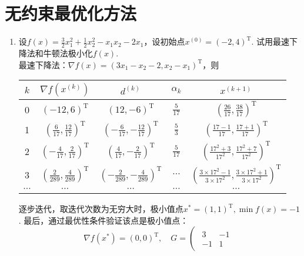 \section{无约束最优化方法}
\begin{enumerate}
    \item 设$\displaystyle f(x)=\frac{3}{2}x_1^2+\frac{1}{2}x_2^2-x_1x_2-2x_1$，设初始点$x^{(0)}=(-2,4)^\mathrm{T}$. 试用最速下降法和牛顿法极小化$f(x)$.\\
    \sol 最速下降法：$\nabla f(x)=(3x_1-x_2-2,x_2-x_1)^\mathrm{T}$，则
    \begin{table}[H]
        \centering
        \begin{tabular}{|c|c|c|c|c|}
            \hline
            $k$ & $\nabla f(x^{(k)})$ & $d^{(k)}$ & $\alpha_k$ & $x^{(k+1)}$ \\ \hline
            0 & $(-12,6)^\mathrm{T}$ & $(12,-6)^\mathrm{T}$ & $\displaystyle\frac{5}{17}$ & $\displaystyle\left(\frac{26}{17},\frac{38}{17}\right)^\mathrm{T}$ \\ \hline
            1 & $\displaystyle\left(\frac{6}{17},\frac{12}{17}\right)^\mathrm{T}$ & $\displaystyle\left(-\frac{6}{17},-\frac{12}{17}\right)^\mathrm{T}$ & $\displaystyle\frac{5}{3}$ & $\displaystyle\left(\frac{17-1}{17},\frac{17+1}{17}\right)^\mathrm{T}$ \\ \hline
            2 & $\displaystyle\left(-\frac{4}{17},\frac{2}{17}\right)^\mathrm{T}$ & $\displaystyle\left(\frac{4}{17},-\frac{2}{17}\right)^\mathrm{T}$ & $\displaystyle\frac{5}{17}$ & $\displaystyle\left(\frac{17^2+3}{17^2},\frac{17^2+7}{17^2}\right)^\mathrm{T}$ \\ \hline
            3 & $\displaystyle\left(\frac{2}{289},\frac{4}{289}\right)^\mathrm{T}$ & $\displaystyle\left(-\frac{2}{289},-\frac{4}{289}\right)^\mathrm{T}$ & $\cdots$ & $\displaystyle\left(\frac{3\times 17^2-1}{3 \times 17^2},\frac{3 \times 17^2+1}{3 \times 17^2}\right)^\mathrm{T}$ \\ \hline
            $\cdots$ & $\cdots$ & $\cdots$ & $\cdots$ & $\cdots$ \\ \hline
        \end{tabular}
    \end{table}
    逐步迭代，取迭代次数为无穷大时，极小值点$x^*=(1,1)^\mathrm{T},\min f(x)=-1$. 最后，通过最优性条件验证该点是极小值点：
    \[\nabla f(x^*)=(0,0)^\mathrm{T}, \quad G=\left(\begin{array}{cc}
        \begin{matrix}
            3 & -1 \\ -1 & 1

\end{matrix}
\end{array}\]
\end{enumerate}

